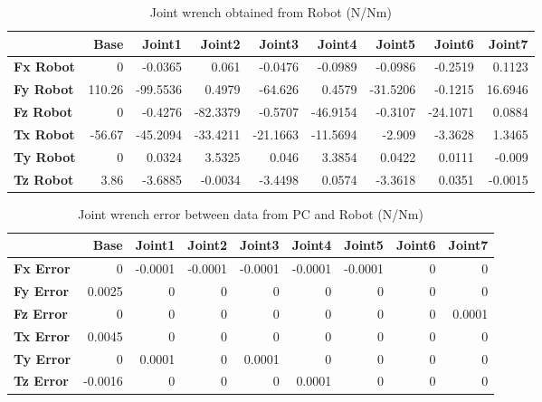 \begin{table}[h!]
	\centering
	\caption{Joint wrench obtained from Robot (N/Nm)}
	\label{wrech_Robot_Pose13}
	\begin{tabular}{|l|r|r|r|r|r|r|r|r|}
		\hline
		\textbf{} & \textbf{Base} & \textbf{Joint1}  & \textbf{Joint2}  & \textbf{Joint3}  & \textbf{Joint4}  & \textbf{Joint5}  & \textbf{Joint6}  & \textbf{Joint7} \\ \hline
		\textbf{Fx Robot}  & 0        & -0.0365        & 0.061        & -0.0476        & -0.0989        & -0.0986        & -0.2519        & 0.1123 \\ \hline
		\textbf{Fy Robot}  & 110.26        & -99.5536        & 0.4979        & -64.626        & 0.4579        & -31.5206        & -0.1215        & 16.6946 \\ \hline
		\textbf{Fz Robot}  & 0        & -0.4276        & -82.3379        & -0.5707        & -46.9154        & -0.3107        & -24.1071        & 0.0884 \\ \hline
		\textbf{Tx Robot}  & -56.67        & -45.2094        & -33.4211        & -21.1663        & -11.5694        & -2.909        & -3.3628        & 1.3465 \\ \hline
		\textbf{Ty Robot}  & 0        & 0.0324        & 3.5325        & 0.046        & 3.3854        & 0.0422        & 0.0111        & -0.009 \\ \hline
		\textbf{Tz Robot}  & 3.86        & -3.6885        & -0.0034        & -3.4498        & 0.0574        & -3.3618        & 0.0351        & -0.0015 \\ \hline
	\end{tabular}
\end{table}

\begin{table}[h!]
	\centering
	\caption{Joint wrench error between data from PC and Robot (N/Nm)}
	\label{wrech_Error_Pose13}
	\begin{tabular}{|l|r|r|r|r|r|r|r|r|}
		\hline
		\textbf{}  & \textbf{Base} & \textbf{Joint1}  & \textbf{Joint2}  & \textbf{Joint3}  & \textbf{Joint4}  & \textbf{Joint5}  & \textbf{Joint6}  & \textbf{Joint7} \\ \hline
		\textbf{Fx Error}  & 0        & -0.0001        & -0.0001        & -0.0001        & -0.0001        & -0.0001        & 0        & 0 \\ \hline
		\textbf{Fy Error}  & 0.0025        & 0        & 0        & 0        & 0        & 0        & 0        & 0 \\ \hline
		\textbf{Fz Error}  & 0        & 0        & 0        & 0        & 0        & 0        & 0        & 0.0001 \\ \hline
		\textbf{Tx Error}  & 0.0045        & 0        & 0        & 0        & 0        & 0        & 0        & 0 \\ \hline
		\textbf{Ty Error}  & 0        & 0.0001        & 0        & 0.0001        & 0        & 0        & 0        & 0 \\ \hline
		\textbf{Tz Error}  & -0.0016        & 0        & 0        & 0        & 0.0001        & 0        & 0        & 0 \\ \hline
	\end{tabular}
\end{table}

